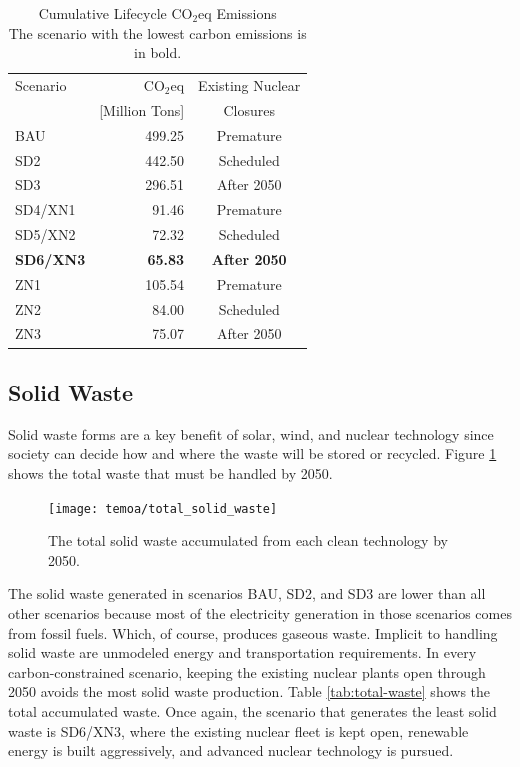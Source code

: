 \begin{table}[H]
  \centering
  \caption{Cumulative Lifecycle CO$_2$eq Emissions\\The scenario with the
  lowest carbon emissions is in bold.}
  \label{tab:co2eq-cumulative}
  \begin{tabular}{lrc}
    \hline
    Scenario & CO$_2$eq & Existing Nuclear \\
    & [Million Tons]& Closures \\
    \hline
    BAU & 499.25& Premature\\
    SD2 & 442.50& Scheduled\\
    SD3 & 296.51& After 2050\\
    SD4/XN1 & 91.46 & Premature\\
    SD5/XN2 & 72.32& Scheduled\\
    \textbf{SD6/XN3} & \textbf{65.83}& \textbf{After 2050}\\
    ZN1 & 105.54& Premature\\
    ZN2 & 84.00& Scheduled\\
    ZN3 & 75.07& After 2050\\
    \hline
  \end{tabular}
\end{table}

\subsection{Solid Waste}

Solid waste forms are a key benefit of solar, wind, and nuclear technology since
society can decide how and where the waste will be stored or recycled. Figure
\ref{fig:total-waste} shows the total waste that must be handled by 2050.

\begin{figure}[H]
  \centering
  \texttt{[image: temoa/total\_solid\_waste]}
  \caption{The total solid waste accumulated from each clean technology by
  2050.}
  \label{fig:total-waste}
\end{figure}

The solid waste generated in scenarios BAU, SD2, and SD3 are lower than all
other scenarios because most of the electricity generation in those scenarios
comes from fossil fuels. Which, of course, produces gaseous waste. Implicit to
handling solid waste are unmodeled energy and transportation requirements.
In every carbon-constrained scenario, keeping the existing nuclear plants open
through 2050 avoids the most solid waste production. Table \ref{tab:total-waste}
shows the total accumulated waste. Once again, the scenario that generates the
least solid waste is SD6/XN3, where the existing nuclear fleet is kept open,
renewable energy is built aggressively, and advanced nuclear technology is
pursued.

